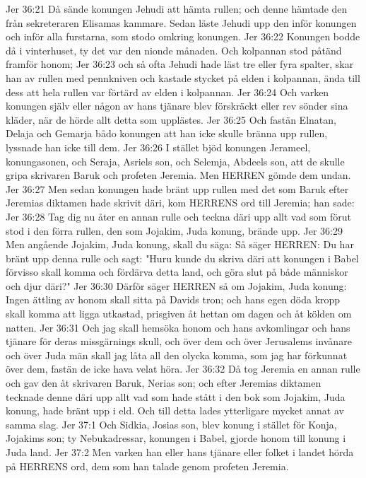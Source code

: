 Jer 36:21  Då sände konungen Jehudi att hämta rullen; och denne hämtade den från sekreteraren Elisamas kammare. Sedan läste Jehudi upp den inför konungen och inför alla furstarna, som stodo omkring konungen.
Jer 36:22  Konungen bodde då i vinterhuset, ty det var den nionde månaden. Och kolpannan stod påtänd framför honom;
Jer 36:23  och så ofta Jehudi hade läst tre eller fyra spalter, skar han av rullen med pennkniven och kastade stycket på elden i kolpannan, ända till dess att hela rullen var förtärd av elden i kolpannan.
Jer 36:24  Och varken konungen själv eller någon av hans tjänare blev förskräckt eller rev sönder sina kläder, när de hörde allt detta som upplästes.
Jer 36:25  Och fastän Elnatan, Delaja och Gemarja bådo konungen att han icke skulle bränna upp rullen, lyssnade han icke till dem.
Jer 36:26  I stället bjöd konungen Jerameel, konungasonen, och Seraja, Asriels son, och Selemja, Abdeels son, att de skulle gripa skrivaren Baruk och profeten Jeremia. Men HERREN gömde dem undan.
Jer 36:27  Men sedan konungen hade bränt upp rullen med det som Baruk efter Jeremias diktamen hade skrivit däri, kom HERRENS ord till Jeremia; han sade:
Jer 36:28  Tag dig nu åter en annan rulle och teckna däri upp allt vad som förut stod i den förra rullen, den som Jojakim, Juda konung, brände upp.
Jer 36:29  Men angående Jojakim, Juda konung, skall du säga: Så säger HERREN: Du har bränt upp denna rulle och sagt: "Huru kunde du skriva däri att konungen i Babel förvisso skall komma och fördärva detta land, och göra slut på både människor och djur däri?"
Jer 36:30  Därför säger HERREN så om Jojakim, Juda konung: Ingen ättling av honom skall sitta på Davids tron; och hans egen döda kropp skall komma att ligga utkastad, prisgiven åt hettan om dagen och åt kölden om natten.
Jer 36:31  Och jag skall hemsöka honom och hans avkomlingar och hans tjänare för deras missgärnings skull, och över dem och över Jerusalems invånare och över Juda män skall jag låta all den olycka komma, som jag har förkunnat över dem, fastän de icke hava velat höra.
Jer 36:32  Då tog Jeremia en annan rulle och gav den åt skrivaren Baruk, Nerias son; och efter Jeremias diktamen tecknade denne däri upp allt vad som hade stått i den bok som Jojakim, Juda konung, hade bränt upp i eld. Och till detta lades ytterligare mycket annat av samma slag.
Jer 37:1  Och Sidkia, Josias son, blev konung i stället för Konja, Jojakims son; ty Nebukadressar, konungen i Babel, gjorde honom till konung i Juda land.
Jer 37:2  Men varken han eller hans tjänare eller folket i landet hörda på HERRENS ord, dem som han talade genom profeten Jeremia.
